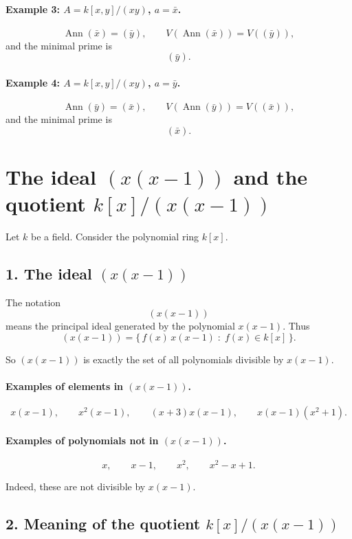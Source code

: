 \documentclass[12pt,a4paper]{article}
\theoremstyle{notespace}
\DeclareMathOperator{\Ann}{Ann}
\begin{document}
\paragraph{Example 3: \(A=k[x,y]/(xy)\), \(a=\bar x\).}
\[
\Ann(\bar x)=(\bar y), \qquad
V(\Ann(\bar x))=V((\bar y)),
\]
and the minimal prime is
\[
(\bar y).
\]

\paragraph{Example 4: \(A=k[x,y]/(xy)\), \(a=\bar y\).}
\[
\Ann(\bar y)=(\bar x), \qquad
V(\Ann(\bar y))=V((\bar x)),
\]
and the minimal prime is
\[
(\bar x).
\]	
	
\section{The ideal \((x(x-1))\) and the quotient \(k[x]/(x(x-1))\)}

Let \(k\) be a field. Consider the polynomial ring \(k[x]\).

\subsection{1. The ideal \((x(x-1))\)}

The notation
\[
(x(x-1))
\]
means the principal ideal generated by the polynomial \(x(x-1)\). Thus
\[
(x(x-1))
=
\{\,f(x)\,x(x-1)\;:\;f(x)\in k[x]\,\}.
\]

So \((x(x-1))\) is exactly the set of all polynomials divisible by \(x(x-1)\).

\paragraph{Examples of elements in \((x(x-1))\).}
\[
x(x-1),\qquad x^2(x-1),\qquad (x+3)x(x-1),\qquad x(x-1)(x^2+1).
\]

\paragraph{Examples of polynomials not in \((x(x-1))\).}
\[
x,\qquad x-1,\qquad x^2,\qquad x^2-x+1.
\]

Indeed, these are not divisible by \(x(x-1)\).

\subsection{2. Meaning of the quotient \(k[x]/(x(x-1))\)}
\end{document}
